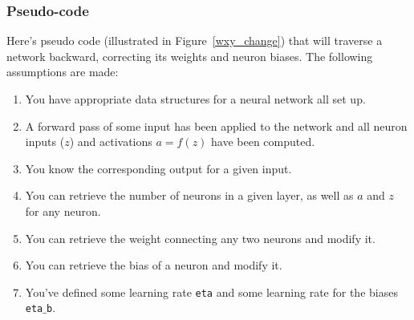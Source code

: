 \documentclass[12pt]{article}
\begin{document}
\subsubsection{Pseudo-code}

Here's pseudo code (illustrated in Figure~\ref{wxy_change}) that will traverse a network backward, correcting its weights and neuron biases. The following assumptions are made: 

\begin{enumerate}
\item You have appropriate data structures for a neural network all set up.
\item A forward pass of some input has been applied to the network and all neuron inputs ($z$) and activations $a=f(z)$ have been computed.  
\item You know the corresponding output for a given input.
\item You can retrieve the number of neurons in a given layer, as well as $a$ and $z$ for any neuron.
\item You can retrieve the weight connecting any two neurons and modify it.
\item You can retrieve the bias of a neuron and modify it.
\item You've defined some learning rate {\tt eta} and some learning rate for the biases {\tt eta$\_$b}.
\end{enumerate}
\end{document}
